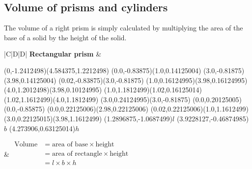 \subsection{Volume of prisms and cylinders}
The volume of a right prism is simply calculated by multiplying the area of the
base of a solid by the height of the solid. 



\begin{table}[h]
\begin{tabular}{|C|D|D|}
\hline
\textbf{Rectangular prism}
&
\begin{center}
\begin{pspicture}(0,-1.2412498)(4.584375,1.2212498)
\psline[linewidth=0.04cm](0.0,-0.83875)(1.0,0.14125004)
\psline[linewidth=0.04cm](3.0,-0.81875)(3.98,0.14125004)
\psline[linewidth=0.04cm](0.02,-0.83875)(3.0,-0.81875)
\psline[linewidth=0.04cm](1.0,0.16124995)(3.98,0.16124995)
\psline[linewidth=0.04cm](4.0,1.2012498)(3.98,0.10124995)
\psline[linewidth=0.04cm](1.0,1.1812499)(1.02,0.16125014)
\psline[linewidth=0.04cm](1.02,1.1612499)(4.0,1.1812499)
\psline[linewidth=0.04cm](3.0,0.24124995)(3.0,-0.81875)
\psline[linewidth=0.04cm](0.0,0.20125005)(0.0,-0.85875)
\psline[linewidth=0.04cm](0.0,0.22125006)(2.98,0.22125006)
\psline[linewidth=0.04cm](0.02,0.22125006)(1.0,1.1612499)
\psline[linewidth=0.04cm](3.0,0.22125015)(3.98,1.1612499)
\rput(1.2896875,-1.0687499){$l$}
\rput(3.9228127,-0.46874985){$b$}
\rput(4.273906,0.63125014){$h$}
\end{pspicture}
\end{center} 
&
$
\begin{aligned}
\mbox{Volume} &= \mbox{area of base} \times \mbox{height} \\
                &= \mbox{area of rectangle} \times \mbox{height} \\
                &= l \times b \times h \\
\end{aligned}$   \\ \hline



\end{tabular}
\end{table}
